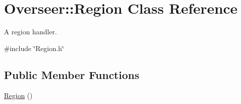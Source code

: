 \hypertarget{classOverseer_1_1Region}{}\section{Overseer\+:\+:Region Class Reference}
\label{classOverseer_1_1Region}


A region handler.  




{\ttfamily \#include \char`\"{}Region.\+h\char`\"{}}

\subsection*{Public Member Functions}
\begin{DoxyCompactItemize}
\item 
\hyperlink{classOverseer_1_1Region_af241efba7a6115b1b1526924ad114ec1}{Region} ()\hypertarget{classOverseer_1_1Region_af241efba7a6115b1b1526924ad114ec1}{}\label{classOverseer_1_1Region_af241efba7a6115b1b1526924ad114ec1}


\end{DoxyCompactItemize}
